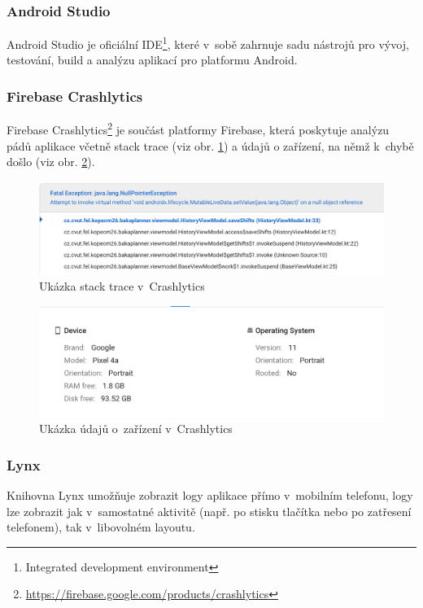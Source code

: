 \documentclass[twoside]{ctuthesis}
\begin{document}
\subsubsection{Android Studio}
Android Studio je oficiální IDE\footnote{Integrated development environment}, které v~sobě zahrnuje sadu nástrojů pro vývoj, testování, build a analýzu aplikací pro platformu Android.

\subsubsection{Firebase Crashlytics}
Firebase Crashlytics\footnote{\url{https://firebase.google.com/products/crashlytics}} je součást platformy Firebase, která poskytuje analýzu pádů aplikace včetně stack trace (viz obr. \ref{fig:crashlytics}) a údajů o zařízení, na němž k~chybě došlo (viz obr. \ref{fig:crashlytics-device}).

\begin{figure}[h!]
	\includegraphics[scale=.45]{img/crashlytics.png}
	\caption{Ukázka stack trace v~Crashlytics}
	\label{fig:crashlytics}
\end{figure}

\begin{figure}[h!]
	\includegraphics[scale=.45]{img/crashlytics_device.png}
	\caption{Ukázka údajů o~zařízení v~Crashlytics}
	\label{fig:crashlytics-device}
\end{figure}

\subsubsection{Lynx}
Knihovna Lynx umožňuje zobrazit logy aplikace přímo v~mobilním telefonu, logy lze zobrazit jak v~samostatné aktivitě (např. po stisku tlačítka nebo po zatřesení telefonem), tak v~libovolném layoutu. \cite{sanchez2020lynx}
\end{document}

